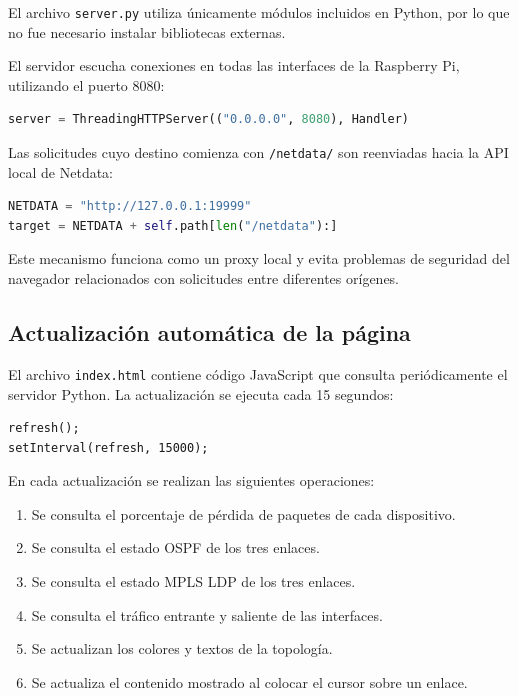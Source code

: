 El archivo \texttt{server.py} utiliza únicamente módulos incluidos en Python,
por lo que no fue necesario instalar bibliotecas externas.

El servidor escucha conexiones en todas las interfaces de la Raspberry Pi,
utilizando el puerto 8080:

\begin{lstlisting}[language=Python]
server = ThreadingHTTPServer(("0.0.0.0", 8080), Handler)
\end{lstlisting}

Las solicitudes cuyo destino comienza con \texttt{/netdata/} son reenviadas
hacia la API local de Netdata:

\begin{lstlisting}[language=Python]
NETDATA = "http://127.0.0.1:19999"
target = NETDATA + self.path[len("/netdata"):]
\end{lstlisting}

Este mecanismo funciona como un proxy local y evita problemas de seguridad del
navegador relacionados con solicitudes entre diferentes orígenes.

\subsection{Actualización automática de la página}

El archivo \texttt{index.html} contiene código JavaScript que consulta
periódicamente el servidor Python. La actualización se ejecuta cada 15
segundos:

\begin{lstlisting}
refresh();
setInterval(refresh, 15000);
\end{lstlisting}

En cada actualización se realizan las siguientes operaciones:

\begin{enumerate}
    \item Se consulta el porcentaje de pérdida de paquetes de cada dispositivo.
    \item Se consulta el estado OSPF de los tres enlaces.
    \item Se consulta el estado MPLS LDP de los tres enlaces.
    \item Se consulta el tráfico entrante y saliente de las interfaces.
    \item Se actualizan los colores y textos de la topología.
    \item Se actualiza el contenido mostrado al colocar el cursor sobre un
    enlace.
\end{enumerate}

